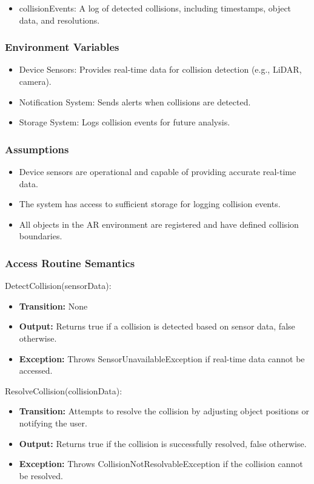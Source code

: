 \documentclass[12pt, titlepage]{article}
\begin{document}
\begin{itemize}
  \item collisionEvents: A log of detected collisions, including timestamps, object data, and resolutions.
\end{itemize}

\subsubsection{Environment Variables}

\begin{itemize}
  \item Device Sensors: Provides real-time data for collision detection (e.g., LiDAR, camera).
  \item Notification System: Sends alerts when collisions are detected.
  \item Storage System: Logs collision events for future analysis.
\end{itemize}

\subsubsection{Assumptions}

\begin{itemize}
  \item Device sensors are operational and capable of providing accurate real-time data.
  \item The system has access to sufficient storage for logging collision events.
  \item All objects in the AR environment are registered and have defined collision boundaries.
\end{itemize}

\subsubsection{Access Routine Semantics}

\noindent DetectCollision(sensorData):
\begin{itemize}
  \item \textbf{Transition:} None
  \item \textbf{Output:} Returns true if a collision is detected based on sensor data, false otherwise.
  \item \textbf{Exception:} Throws SensorUnavailableException if real-time data cannot be accessed.
\end{itemize}

\noindent ResolveCollision(collisionData):
\begin{itemize}
  \item \textbf{Transition:} Attempts to resolve the collision by adjusting object positions or notifying the user.
  \item \textbf{Output:} Returns true if the collision is successfully resolved, false otherwise.
  \item \textbf{Exception:} Throws CollisionNotResolvableException if the collision cannot be resolved.
\end{itemize}
\end{document}
